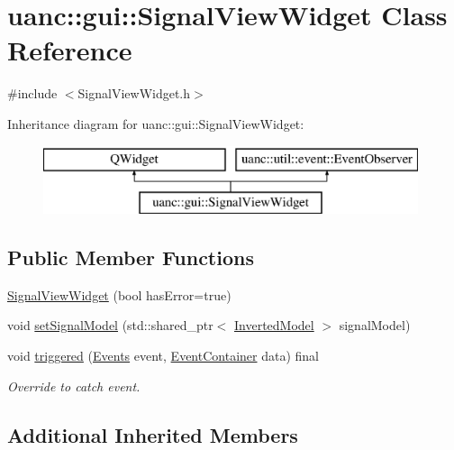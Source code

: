 \hypertarget{classuanc_1_1gui_1_1_signal_view_widget}{}\section{uanc\+:\+:gui\+:\+:Signal\+View\+Widget Class Reference}
\label{classuanc_1_1gui_1_1_signal_view_widget}


{\ttfamily \#include $<$Signal\+View\+Widget.\+h$>$}

Inheritance diagram for uanc\+:\+:gui\+:\+:Signal\+View\+Widget\+:\begin{figure}[H]
\begin{center}
\leavevmode
\includegraphics[height=2.000000cm]{classuanc_1_1gui_1_1_signal_view_widget}
\end{center}
\end{figure}
\subsection*{Public Member Functions}
\begin{DoxyCompactItemize}
\item 
\hyperlink{classuanc_1_1gui_1_1_signal_view_widget_aeffeeef7831e71d328e9ec0ae02a778c}{Signal\+View\+Widget} (bool has\+Error=true)
\item 
void \hyperlink{classuanc_1_1gui_1_1_signal_view_widget_a6f69d9363e91c997725a510284fc2f94}{set\+Signal\+Model} (std\+::shared\+\_\+ptr$<$ \hyperlink{classuanc_1_1amv_1_1_inverted_model}{Inverted\+Model} $>$ signal\+Model)
\item 
void \hyperlink{classuanc_1_1gui_1_1_signal_view_widget_a2f070824372de0e83960814229d93b46}{triggered} (\hyperlink{namespaceuanc_1_1util_1_1event_a63f690675589114db9c6bcbe6f1088a4}{Events} event, \hyperlink{classuanc_1_1util_1_1event_1_1_event_container}{Event\+Container} data) final
\begin{DoxyCompactList}\small\item\em Override to catch event. \end{DoxyCompactList}\end{DoxyCompactItemize}
\subsection*{Additional Inherited Members}


